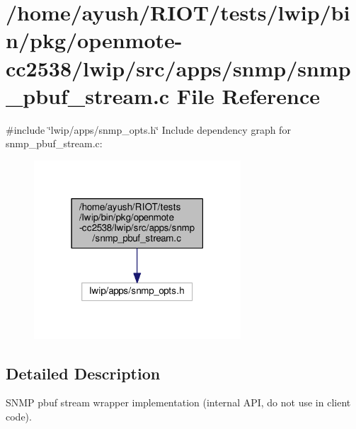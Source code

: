 \hypertarget{openmote-cc2538_2lwip_2src_2apps_2snmp_2snmp__pbuf__stream_8c}{}\section{/home/ayush/\+R\+I\+O\+T/tests/lwip/bin/pkg/openmote-\/cc2538/lwip/src/apps/snmp/snmp\+\_\+pbuf\+\_\+stream.c File Reference}
\label{openmote-cc2538_2lwip_2src_2apps_2snmp_2snmp__pbuf__stream_8c}
{\ttfamily \#include \char`\"{}lwip/apps/snmp\+\_\+opts.\+h\char`\"{}}\newline
Include dependency graph for snmp\+\_\+pbuf\+\_\+stream.\+c\+:
\nopagebreak
\begin{figure}[H]
\begin{center}
\leavevmode
\includegraphics[width=219pt]{openmote-cc2538_2lwip_2src_2apps_2snmp_2snmp__pbuf__stream_8c__incl}
\end{center}
\end{figure}


\subsection{Detailed Description}
S\+N\+MP pbuf stream wrapper implementation (internal A\+PI, do not use in client code). 